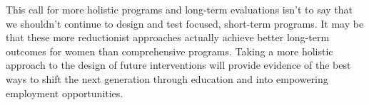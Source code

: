 \documentclass[11pt]{article}
\begin{document}
This call for more holistic programs and long-term evaluations isn't to say that we shouldn't continue to design and test focused, short-term programs. It may be that these more reductionist approaches actually achieve better long-term outcomes for women than comprehensive programs. Taking a more holistic approach to the design of future interventions will provide evidence of the best ways to shift the next generation through education and into empowering employment opportunities. 



\newpage



% 
\end{document}
